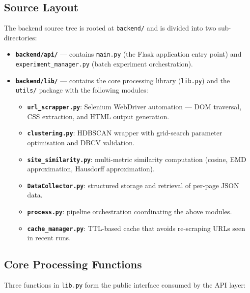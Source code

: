 \subsection{Source Layout}

The backend source tree is rooted at \texttt{backend/} and is divided into two sub-directories:

\begin{itemize}
    \item \textbf{\texttt{backend/api/}} --- contains \texttt{main.py} (the Flask application entry point) and \texttt{experiment\_manager.py} (batch experiment orchestration).
    \item \textbf{\texttt{backend/lib/}} --- contains the core processing library (\texttt{lib.py}) and the \texttt{utils/} package with the following modules:
    \begin{itemize}
        \item \textbf{\texttt{url\_scrapper.py}}: Selenium WebDriver automation --- DOM traversal, CSS extraction, and HTML output generation.
        \item \textbf{\texttt{clustering.py}}: HDBSCAN wrapper with grid-search parameter optimisation and DBCV validation.
        \item \textbf{\texttt{site\_similarity.py}}: multi-metric similarity computation (cosine, EMD approximation, Hausdorff approximation).
        \item \textbf{\texttt{DataCollector.py}}: structured storage and retrieval of per-page JSON data.
        \item \textbf{\texttt{process.py}}: pipeline orchestration coordinating the above modules.
        \item \textbf{\texttt{cache\_manager.py}}: TTL-based cache that avoids re-scraping URLs seen in recent runs.
    \end{itemize}
\end{itemize}

\subsection{Core Processing Functions}

Three functions in \texttt{lib.py} form the public interface consumed by the API layer:

